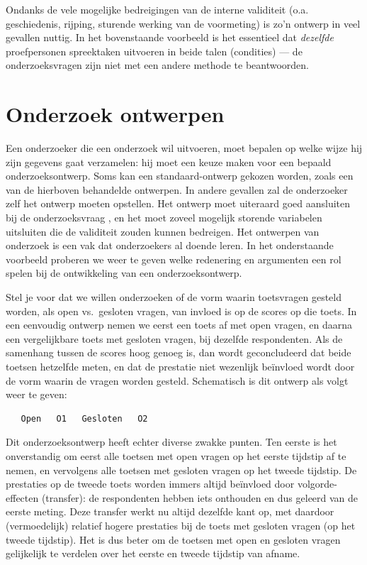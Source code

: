 \documentclass[
]{book}
\begin{document}
Ondanks de vele mogelijke bedreigingen van de interne validiteit (o.a.
geschiedenis, rijping, sturende werking van de voormeting) is zo'n
ontwerp in veel gevallen nuttig. In het bovenstaande voorbeeld is het
essentieel dat \emph{dezelfde} proefpersonen spreektaken uitvoeren in beide
talen (condities) --- de onderzoeksvragen zijn niet met een andere
methode te beantwoorden.

\section{Onderzoek ontwerpen}\label{onderzoek-ontwerpen}

Een onderzoeker die een onderzoek wil uitvoeren, moet bepalen op welke
wijze hij zijn gegevens gaat verzamelen: hij moet een keuze maken voor
een bepaald onderzoeksontwerp. Soms kan een standaard-ontwerp gekozen
worden, zoals een van de hierboven behandelde ontwerpen. In andere
gevallen zal de onderzoeker zelf het ontwerp moeten opstellen. Het
ontwerp moet uiteraard goed aansluiten bij de onderzoeksvraag
\citep{Levin99}, en het moet zoveel mogelijk storende variabelen uitsluiten
die de validiteit zouden kunnen bedreigen. Het ontwerpen van onderzoek
is een vak dat onderzoekers al doende leren. In het onderstaande
voorbeeld proberen we weer te geven welke redenering en argumenten een
rol spelen bij de ontwikkeling van een onderzoeksontwerp.

Stel je voor dat we willen onderzoeken of de vorm waarin toetsvragen
gesteld worden, als open vs.~gesloten vragen, van invloed is op de
scores op die toets. In een eenvoudig ontwerp nemen we eerst een toets
af met open vragen, en daarna een vergelijkbare toets met gesloten
vragen, bij dezelfde respondenten. Als de samenhang tussen de scores
hoog genoeg is, dan wordt geconcludeerd dat beide toetsen hetzelfde
meten, en dat de prestatie niet wezenlijk beïnvloed wordt door de vorm
waarin de vragen worden gesteld. Schematisch is dit ontwerp als volgt
weer te geven:

\begin{verbatim}
   Open   O1   Gesloten   O2
\end{verbatim}

Dit onderzoeksontwerp heeft echter diverse zwakke punten. Ten eerste is
het onverstandig om eerst alle toetsen met open vragen op het eerste
tijdstip af te nemen, en vervolgens alle toetsen met gesloten vragen op
het tweede tijdstip. De prestaties op de tweede toets worden immers
altijd beïnvloed door volgorde-effecten (transfer): de respondenten
hebben iets onthouden en dus geleerd van de eerste meting. Deze transfer
werkt nu altijd dezelfde kant op, met daardoor (vermoedelijk) relatief
hogere prestaties bij de toets met gesloten vragen (op het tweede
tijdstip). Het is dus beter om de toetsen met open en gesloten vragen
gelijkelijk te verdelen over het eerste en tweede tijdstip van afname.
\end{document}
